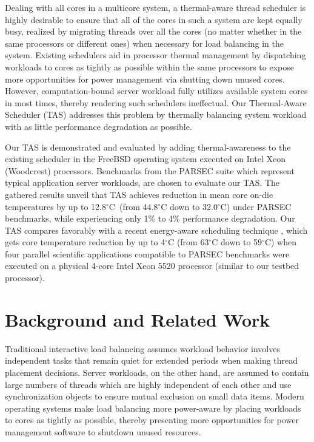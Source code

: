 \documentclass[times, 10pt,twocolumn]{IEEEtran}
\begin{document}
Dealing with all cores in a multicore system, a thermal-aware thread
scheduler is highly desirable to ensure that all of the cores in such a
system are kept equally busy, realized by migrating threads over all the
cores (no matter whether in the same processors or different ones) when
necessary for load balancing in the system.  Existing schedulers aid in
processor thermal management by dispatching workloads to cores as
tightly as possible within the same processors to expose more
opportunities for power management via shutting down unused cores.
However, computation-bound server workload fully utilizes available
system cores in most times, thereby rendering such schedulers
ineffectual.  Our Thermal-Aware Scheduler (TAS) addresses this problem
by thermally balancing system workload with as little performance
degradation as possible.  

Our TAS is demonstrated and evaluated by adding thermal-awareness to the
existing scheduler in the FreeBSD operating system executed on Intel
Xeon (Woodcrest) processors.  Benchmarks from the PARSEC suite which
represent typical application server workloads, are chosen to evaluate
our TAS.  The gathered results unveil that TAS achieves reduction in
mean core on-die temperatures by up to 12.8$^{\circ}$C\ (from 44.8$^\circ$C
down to 32.0$^\circ$C) under PARSEC benchmarks, while experiencing only
1\% to 4\% performance degradation.  Our TAS compares favorably with a
recent energy-aware scheduling technique \cite{Sarood2011}, which gets
core temperature reduction by up to 4$^\circ$C (from 63$^\circ$C down to
59$^\circ$C) when four parallel scientific applications compatible to PARSEC
benchmarks were executed on a physical 4-core Intel Xeon 5520 processor
(similar to our testbed processor).

\section{Background and Related Work}
\label{sec:related}
Traditional interactive load balancing assumes workload behavior
involves independent tasks that remain quiet for extended periods when
making thread placement decisions.  Server workloads, on the other hand,
are assumed to contain large numbers of threads which are highly
independent of each other and use synchronization objects to ensure
mutual exclusion on small data items.  Modern operating systems make
load balancing more power-aware by placing workloads to cores as tightly
as possible, thereby presenting more opportunities for power management
software to shutdown unused resources.
\end{document}
